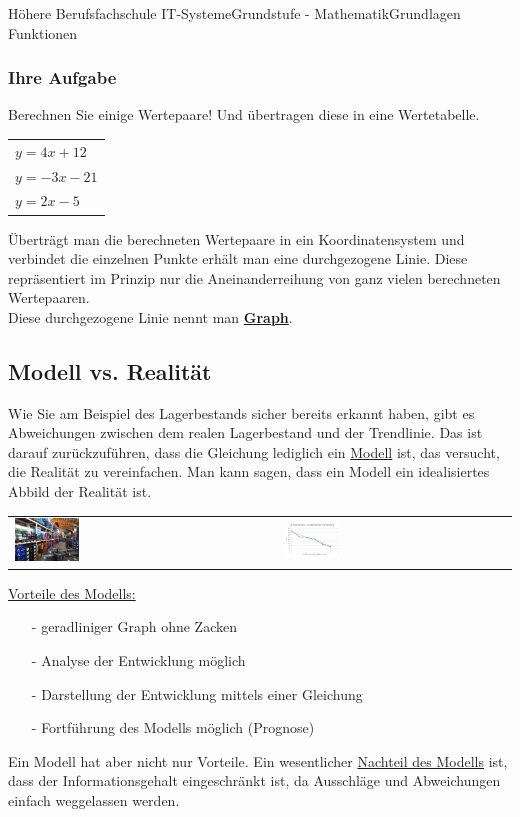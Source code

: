 \documentclass[11pt,twocolumn,oneside,openany,headings=optiontotoc,11pt,numbers=noenddot]{article}
\begin{document}
\begin{worksheet}{Höhere Berufsfachschule IT-Systeme}{Grundstufe - Mathematik}{Grundlagen Funktionen}
		\subsubsection*{Ihre Aufgabe} Berechnen Sie einige Wertepaare! Und übertragen diese in eine Wertetabelle.
		\centering
		\begin{tabularx}{0.45\textwidth}{X}
			\(y = 4x + 12\)\\
			\(y = -3x - 21\)\\
			\(y = 2x - 5\)
		\end{tabularx}
		\raggedright
		Überträgt man die berechneten Wertepaare in ein Koordinatensystem und verbindet die einzelnen Punkte erhält man eine durchgezogene Linie. Diese repräsentiert im Prinzip nur die Aneinanderreihung von ganz vielen berechneten Wertepaaren.\\
		Diese durchgezogene Linie nennt man \underline{\textbf{Graph}}.
		\subsection{Modell vs. Realität}
		Wie Sie am Beispiel des Lagerbestands sicher bereits erkannt haben, gibt es Abweichungen zwischen dem realen Lagerbestand und der Trendlinie. Das ist darauf zurückzuführen, dass die Gleichung lediglich ein \underline{Modell} ist, das versucht, die Realität zu vereinfachen. Man kann sagen, dass ein Modell ein idealisiertes Abbild der Realität ist.\\
		\par\bigskip\noindent
		\begin{tabularx}{0.45\textwidth}{XX}
			\includegraphics[width=0.25\textwidth]{../99_Bilder/lager.jpg} & \includegraphics[width=0.25\textwidth]{../99_Bilder/bier2.jpg}
		\end{tabularx}
		\par\bigskip\noindent
		\underline{Vorteile des Modells:}
		\begin{itemize}
			\item[-] geradliniger Graph ohne Zacken
			\item[-] Analyse der Entwicklung möglich
			\item[-] Darstellung der Entwicklung mittels einer Gleichung
			\item[-] Fortführung des Modells möglich (Prognose)
		\end{itemize}
		Ein Modell hat aber nicht nur Vorteile. Ein wesentlicher \underline{Nachteil des Modells} ist, dass der Informationsgehalt eingeschränkt ist, da Ausschläge und Abweichungen einfach weggelassen werden.

\end{worksheet}
\end{document}
